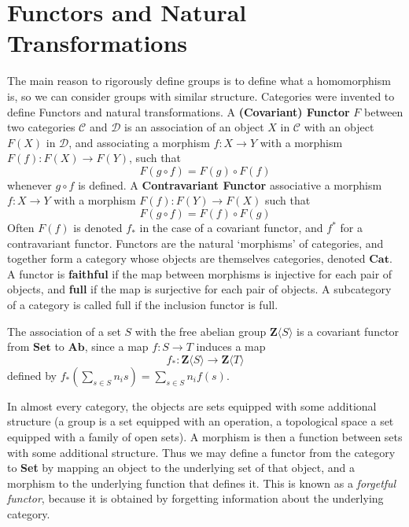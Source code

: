 \section{Functors and Natural Transformations}

The main reason to rigorously define groups is to define what a homomorphism is, so we can consider groups with similar structure. Categories were invented to define Functors and natural transformations. A {\bf (Covariant) Functor} $F$ between two categories $\mathcal{C}$ and $\mathcal{D}$ is an association of an object $X$ in $\mathcal{C}$ with an object $F(X)$ in $\mathcal{D}$, and associating a morphism $f: X \to Y$ with a morphism $F(f): F(X) \to F(Y)$, such that
%
\[ F(g \circ f) = F(g) \circ F(f) \]
%
whenever $g \circ f$ is defined. A {\bf Contravariant Functor} associative a morphism $f: X \to Y$ with a morphism $F(f): F(Y) \to F(X)$ such that
%
\[ F(g \circ f) = F(f) \circ F(g) \]
%
Often $F(f)$ is denoted $f_*$ in the case of a covariant functor, and $f^*$ for a contravariant functor. Functors are the natural `morphisms' of categories, and together form a category whose objects are themselves categories, denoted $\mathbf{Cat}$. A functor is {\bf faithful} if the map between morphisms is injective for each pair of objects, and {\bf full} if the map is surjective for each pair of objects. A subcategory of a category is called full if the inclusion functor is full.

\begin{example}
    The association of a set $S$ with the free abelian group $\mathbf{Z}\langle S \rangle$ is a covariant functor from $\mathbf{Set}$ to $\mathbf{Ab}$, since a map $f: S \to T$ induces a map
    \[ f_*: \mathbf{Z} \langle S \rangle \to \mathbf{Z} \langle T \rangle \]
    defined by $f_*(\sum_{s \in S} n_i s) = \sum_{s \in S} n_i f(s)$.
\end{example}

\begin{example}
    In almost every category, the objects are sets equipped with some additional structure (a group is a set equipped with an operation, a topological space a set equipped with a family of open sets). A morphism is then a function between sets with some additional structure. Thus we may define a functor from the category to {\bf Set} by mapping an object to the underlying set of that object, and a morphism to the underlying function that defines it. This is known as a {\it forgetful functor}, because it is obtained by forgetting information about the underlying category.
\end{example}

